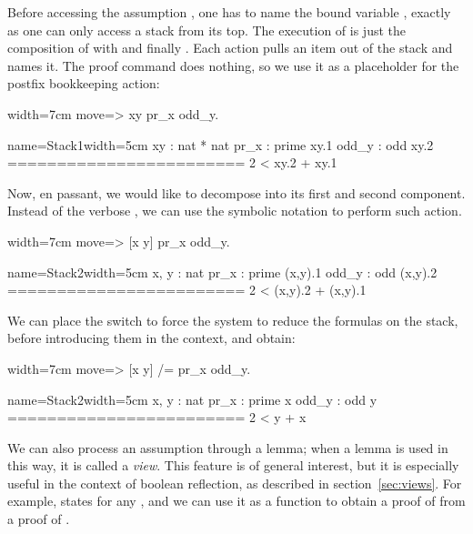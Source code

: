 Before accessing the assumption , one has to name the
bound variable , exactly as one can only access a stack from its top.
The execution of  is just the composition of
 with  and finally .  Each action
pulls an item out of the stack and names it.  The  proof
command does nothing, so we use it as a placeholder
for the postfix \C{=>} bookkeeping action:

\begin{coq}{}{width=7cm}
move=> xy pr_x odd_y.
\end{coq}
\begin{coqout}{name=Stack1}{width=5cm}
 xy : nat * nat
 pr_x : prime xy.1
 odd_y : odd xy.2
========================
 2 < xy.2 + xy.1
\end{coqout}

Now, en passant, we would like to decompose  into its first
and second component.  Instead of the verbose ,
we can use the symbolic notation \C{[]} to perform such action.

\begin{coq}{}{width=7cm}
move=> [x y] pr_x odd_y.
\end{coq}
\begin{coqout}{name=Stack2}{width=5cm}
 x, y : nat
 pr_x : prime (x,y).1
 odd_y : odd (x,y).2
========================
 2 < (x,y).2 + (x,y).1
\end{coqout}

We can place the \C{/=} switch to force the system to reduce the formulas on
the stack, before introducing them in the context, and obtain:

\begin{coq}{}{width=7cm}
move=> [x y] /= pr_x odd_y.
\end{coq}
\begin{coqout}{name=Stack2}{width=5cm}
 x, y : nat
 pr_x : prime x
 odd_y : odd y
========================
 2 < y + x
\end{coqout}

We can also process an assumption through a lemma; when a lemma is
used in this way, it is called a \emph{view}. This feature is of
general interest, but it is especially useful in the context of boolean
reflection, as described in section~\ref{sec:views}. For example,
 states  for any , and we can
use it as a function to obtain a proof of   from a proof
of .


